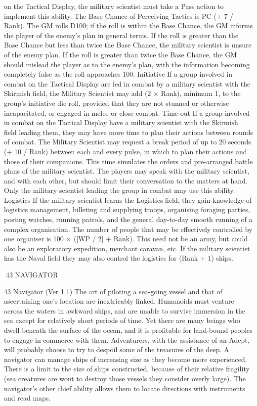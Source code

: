 \documentclass[a4paper]{article}
\begin{document}
\begin{multicols}{3}
on the Tactical Display, the military scientist must
take a Pass action to implement this ability. The
Base Chance of Perceiving Tactics is PC (+ 7 /
Rank). The GM rolls D100; if the roll is within the
Base Chance, the GM informs the player of the
enemy’s plan in general terms. If the roll is greater
than the Base Chance but less than twice the Base
Chance, the military scientist is unsure of the enemy plan. If the roll is greater than twice the Base
Chance, the GM should mislead the player as to the
enemy’s plan, with the information becoming
completely false as the roll approaches 100.
Initiative
If a group involved in combat on the Tactical Display are led in combat by a military scientist with
the Skirmish field, the Military Scientist may add
(2 × Rank), minimum 1, to the group’s initiative
die roll, provided that they are not stunned or otherwise incapacitated, or engaged in melee or close
combat.
Time out
If a group involved in combat on the Tactical Display have a military scientist with the Skirmish
field leading them, they may have more time to
plan their actions between rounds of combat. The
Military Scientist may request a break period of up
to 20 seconds (+ 10 / Rank) between each and
every pulse, in which to plan their actions and
those of their companions. This time simulates the
orders and pre-arranged battle plans of the military
scientist. The players may speak with the military
scientist, and with each other, but should limit their
conversation to the matters at hand. Only the military scientist leading the group in combat may use
this ability.
Logistics
If the military scientist learns the Logistics field,
they gain knowledge of logistics management,
billeting and supplying troops, organising foraging
parties, posting watches, running patrols, and the
general day-to-day smooth running of a complex
organisation. The number of people that may be
effectively controlled by one organiser is 100 ×
([WP / 2] + Rank). This need not be an army, but
could also be an exploratory expedition, merchant
caravan, etc. If the military scientist has the Naval
field they may also control the logistics for (Rank
+ 1) ships.

43 NAVIGATOR

43 Navigator (Ver 1.1)
The art of piloting a sea-going vessel and that of
ascertaining one’s location are inextricably linked.
Humanoids must venture across the waters in
awkward ships, and are unable to survive immersion in the sea except for relatively short periods of
time. Yet there are many beings who dwell beneath
the surface of the ocean, and it is profitable for
land-bound peoples to engage in commerce with
them. Adventurers, with the assistance of an Adept,
will probably choose to try to despoil some of the
treasures of the deep.
A navigator can manage ships of increasing size as
they become more experienced. There is a limit to
the size of ships constructed, because of their relative fragility (sea creatures are wont to destroy
those vessels they consider overly large). The
navigator’s other chief ability allows them to locate
directions with instruments and read maps.


\end{multicols}
\end{document}
